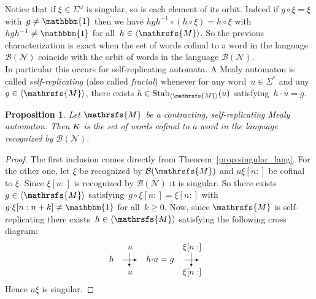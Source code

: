 \documentclass{amsart}
\newtheorem{proposition}[theorem]{Proposition}
\begin{document}
Notice that if $\xi \in {{{\Sigma}}}^{\omega}$ is singular, so is  each element of its orbit. Indeed if $g{{{\circ}}} \xi = \xi$ with~$g \neq \operatorname{\mathbbm{1}}$ then we have $hgh^{-1}{{{\circ}}} (h {{{\circ}}} \xi) = h{{{\circ}}} \xi$ with~ $hgh^{-1}  \neq \operatorname{\mathbbm{1}}$  for all~$h \in {{{\langle}{{\mathrsfs{{{M}}}}}{\rangle}}}$. So the previous characterization is exact when the set of words cofinal to a word in the language~${\mathcal{B}({\mathcal{N}})}$  coincide with the orbit of  words in the language ${\mathcal{B}({\mathcal{N}})}$.\\
In particular this occurs for self-replicating automata. A Mealy  automaton is called \emph{self-replicating} (also called \emph{fractal}) whenever for any word~$u \in {{{\Sigma}}}^*$ and any~$g \in {{{\langle}{{\mathrsfs{{{M}}}}}{\rangle}}}$, there exists $h \in \operatorname{Stab}_{{{\langle}{{\mathrsfs{{{M}}}}}{\rangle}}}(u)$ satisfying~$h{{{\cdot}}} u = g$. 
\begin{proposition}\label{prop-charac self replic}
Let ${{{\mathrsfs{{M}}}}}$ be a contracting, self-replicating Mealy automaton. Then ${\hbox{\Large{$\kappa$}}}$ is the set of words cofinal to a word in the language recognized by ${\mathcal{B}({\mathcal{N}})}$.
\end{proposition}
\begin{proof}
The first inclusion comes directly from Theorem~\ref{prop:singular_lang}. For the other one, let $\xi$ be recognized by ${\mathcal{B}({{{\mathrsfs{{M}}}}})}$ and $u\xi[n:]$ be cofinal to $\xi$. 
Since $\xi[n:]$ is recognized by ${\mathcal{B}({\mathcal{N}})}$ it is singular. So there exists~$g \in {{{\langle}{{\mathrsfs{{{M}}}}}{\rangle}}}$ satisfying~$g{{{\circ}}} \xi[n:] = \xi[n:]$ with~$g{{{\cdot}}} \xi[n: n+k] \neq \operatorname{\mathbbm{1}}$ for all~$k\geq 0$. Now, since ${{{\mathrsfs{{M}}}}}$ is self-replicating there exists~$h \in {{{\langle}{{\mathrsfs{{{M}}}}}{\rangle}}}$ satisfying the following cross diagram: 
\[
\begin{array}{c c c c c c}

	&	u		&		& \xi[n:]	&	\\
h	&	{\tikz[baseline=-.5ex]{\draw[->,>=latex] (0,0) -- (4ex,0); \draw[->,>=latex] (1.8ex,2ex) -- (1.8ex,-2ex);}}	&	h{{{\cdot}}} u = g	&{\tikz[baseline=-.5ex]{\draw[->,>=latex] (0,0) -- (4ex,0); \draw[->,>=latex] (1.8ex,2ex) -- (1.8ex,-2ex);}}	& \\
	&	u		&		& \xi[n:]	&	\\
\end{array}
\]
Hence $u\xi$ is singular.
\end{proof}
\end{document}
